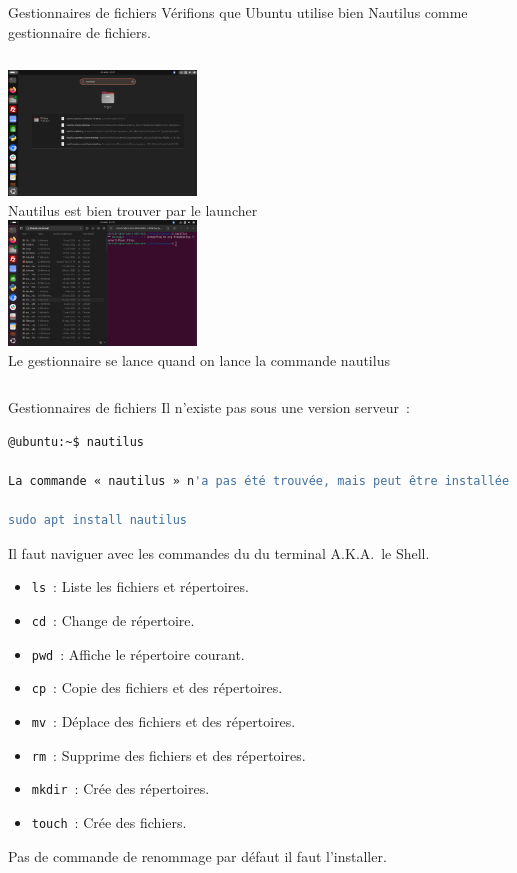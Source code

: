 \documentclass{beamer}
\begin{document}
    \begin{frame}{Gestionnaires de fichiers}
        Vérifions que Ubuntu utilise bien Nautilus comme gestionnaire de fichiers.
        \bigbreak
        \begin{columns}
            \centering
            \includegraphics[width=5cm]{image/nautilus-gui} \\ Nautilus est bien trouver par le launcher \\
            \centering
            \includegraphics[width=5cm]{image/nautilus-cli} \\ Le gestionnaire se lance quand on lance la commande nautilus \\
        \end{columns}
    \end{frame}

    \begin{frame}[fragile]{Gestionnaires de fichiers}
        Il n'existe pas sous une version serveur~:
        \begin{lstlisting}[language=bash]
@ubuntu:~$ nautilus

La commande « nautilus » n'a pas été trouvée, mais peut être installée avec~:

sudo apt install nautilus
        \end{lstlisting}
        Il faut naviguer avec les commandes du du terminal A.K.A.\ le Shell.
        \begin{itemize}
            \item \lstinline{ls}~: Liste les fichiers et répertoires.
            \item \lstinline{cd}~: Change de répertoire.
            \item \lstinline{pwd}~: Affiche le répertoire courant.
            \item \lstinline{cp}~: Copie des fichiers et des répertoires.
            \item \lstinline{mv}~: Déplace des fichiers et des répertoires.
            \item \lstinline{rm}~: Supprime des fichiers et des répertoires.
            \item \lstinline{mkdir}~: Crée des répertoires.
            \item \lstinline{touch}~: Crée des fichiers.
        \end{itemize}
        Pas de commande de renommage par défaut il faut l'installer.
    \end{frame}
\end{document}
